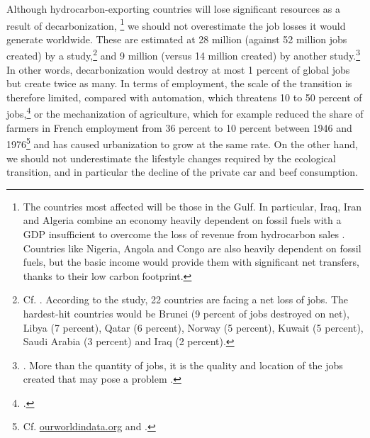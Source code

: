 \documentclass[a5paper,english,openany]{memoir}
\begin{document}
Although hydrocarbon-exporting countries will lose significant resources as a result of decarbonization, %
\footnote{The countries most affected will be those in the Gulf. In particular, Iraq, Iran and Algeria combine an economy heavily dependent on fossil fuels with a GDP insufficient to overcome the loss of revenue from hydrocarbon sales \citep{muttitt_equity_2020}. Countries like Nigeria, Angola and Congo are also heavily dependent on fossil fuels, but the basic income would provide them with significant net transfers, thanks to their low carbon footprint.} we should not overestimate the job losses it would generate worldwide. These are estimated at 28 million (against 52 million jobs created) by a study,\footnote{Cf. \cite{jacobson_100_2017}. According to the study, 22 countries are facing a net loss of jobs. The hardest-hit countries would be Brunei (9 percent of jobs destroyed on net), Libya (7 percent), Qatar (6 percent), Norway (5 percent), Kuwait (5 percent), Saudi Arabia (3 percent) and Iraq (2 percent).} and 9 million (versus 14 million created) by another study.\footnote{\cite{pai_meeting_2021}. More than the quantity of jobs, it is the quality and location of the jobs created that may pose a problem \citep{haywood_welfare_2021}.} In other words, decarbonization %
would destroy at most 1 percent of global jobs but %
create twice as many. In terms of employment, the scale of the transition is therefore limited, compared with automation, which threatens 10 to 50 percent of jobs,\footnote{\cite{frey_future_2017,lassebie_what_2022,hatzius_global_2023}.} or the mechanization of agriculture, which for example reduced the share of farmers in French employment from 36 percent to 10 percent between 1946 and 1976\footnote{Cf. \href{https://ourworldindata.org/grapher/urbanization-last-500-years?country=~FRA}{ourworldindata.org} and \href{https://ourworldindata.org/grapher/share-of-the-labor-force-employed-in-agriculture?tab=chart&time=1800..latest&country=FRA}{\cite{herrendorf_chapter_2014}}.} and has caused urbanization %
to grow at the same rate. On the other hand, we should not underestimate the lifestyle changes required by the ecological transition, %
and in particular the decline of the private car and beef consumption.
\end{document}
